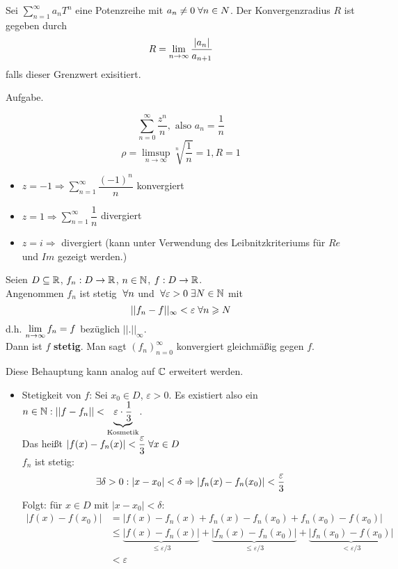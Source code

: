 \documentclass[main.tex]{subfiles}
\begin{document}
\begin{Lemma}
  Sei $\sum \limits_{n=1}^\infty a_n T^n$ eine Potenzreihe mit $a_n \neq 0 \;\forall n\in N$. Der Konvergenzradius $R$ ist gegeben durch
  $$R = \lim \limits_{n \to \infty} \dfrac{|a_n|}{a_{n+1}}$$
  falls dieser Grenzwert exisitiert.
\end{Lemma}
\begin{Beweis}
  Aufgabe.
\end{Beweis}

\begin{Beispiel}
  $$\sum \limits_{n=0}^\infty \dfrac{z^n}{n}, \text{ also } a_n = \dfrac{1}{n}$$
  $$\rho = \limsup_{n \to \infty} \sqrt[n]{\dfrac{1}{n}} = 1, R = 1$$
  \begin{itemize}
    \item $z = -1 \Rightarrow \sum \limits_{n=1}^\infty \dfrac{(-1)^n}{n}$ konvergiert
    \item $z = 1 \Rightarrow \sum \limits_{n=1}^\infty \dfrac{1}{n}$ divergiert
    \item $z = i \Rightarrow$ divergiert (kann unter Verwendung des Leibnitzkriteriums für $Re$ und $Im$ gezeigt werden.)
  \end{itemize}
\end{Beispiel}

\begin{Lemma}
  Seien $D \subseteq \mathbb{R}$, $f_n: D \to \mathbb{R}$, $n \in \mathbb{N}$, $f: D \to \mathbb{R}$.\\
  Angenommen $f_n$ ist stetig $\;\forall n$ und $\;\forall \varepsilon > 0 \;\exists N \in \mathbb{N}$ mit
  $$||f_n - f||_\infty < \varepsilon \;\forall n \geqslant N$$
  d.h. $\lim \limits_{n \to \infty} f_n = f$ bezüglich $||.||_\infty$.\\
  Dann ist $f$ \textbf{ stetig}. Man sagt $(f_n)_{n=0}^\infty$ konvergiert gleichmäßig gegen $f$.
\end{Lemma}

\begin{Bemerkung}
  Diese Behauptung kann analog auf $\mathbb{C}$ erweitert werden.
\end{Bemerkung}

\begin{Beweis}
  \begin{itemize}
    \item Stetigkeit von $f$: Sei $x_0 \in D$, $\varepsilon > 0$. Es existiert also ein $n \in \mathbb{N} : ||f-f_n|| < \underbrace{\varepsilon \cdot \frac{1}{3}}_{\text{Kosmetik}}$.\\
      Das heißt $|f(x)-f_n(x)| < \dfrac{\varepsilon}{3} \;\forall x \in D$\\
      $f_n$ ist stetig: $$\;\exists \delta > 0 : |x - x_0| < \delta \Rightarrow |f_n(x) - f_n(x_0)| < \dfrac{\varepsilon}{3}$$
      Folgt: für $x \in D$ mit $|x - x_0| < \delta$:
      $$\begin{aligned}
      |f(x)-f(x_0)| &= |f(x) -f_n(x) + f_n(x) - f_n(x_0) + f_n(x_0) - f(x_0)|\\
      &\leq \underbrace{|f(x)-f_n(x)|}_{\leq \varepsilon/3} + \underbrace{|f_n(x) - f_n(x_0)|}_{\leq \varepsilon/3} + \underbrace{|f_n(x_0) - f(x_0)|}_{< \varepsilon/3}\\
      &< \varepsilon
      \end{aligned}$$
  \end{itemize}
\end{Beweis}
\end{document}
